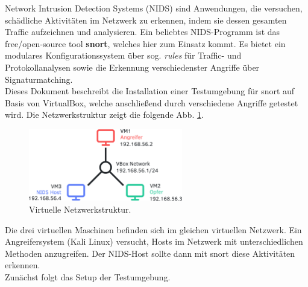 Network Intrusion Detection Systems (NIDS) sind Anwendungen, die versuchen, schädliche Aktivitäten im Netzwerk zu erkennen, indem sie dessen gesamten Traffic aufzeichnen und analysieren. Ein beliebtes NIDS-Programm ist das free/open-source tool \textbf{snort}, welches hier zum Einsatz kommt. Es bietet ein modulares Konfigurationssystem über sog. \textit{rules} für Traffic- und Protokollanalysen sowie die Erkennung verschiedenster Angriffe über Signaturmatching.\\

Dieses Dokument beschreibt die Installation einer Testumgebung für snort auf Basis von VirtualBox, welche anschließend durch verschiedene Angriffe getestet wird. Die Netzwerkstruktur zeigt die folgende Abb. \ref{fig:network-structure}.

\begin{figure}[H]
  \centering
  \includegraphics[width=0.6\textwidth]{graphics/intro/network.pdf}
  \caption{Virtuelle Netzwerkstruktur.}\label{fig:network-structure}
\end{figure}

Die drei virtuellen Maschinen befinden sich im gleichen virtuellen Netzwerk. Ein Angreifersystem (Kali Linux) versucht, Hosts im Netzwerk mit unterschiedlichen Methoden anzugreifen. Der NIDS-Host sollte dann mit snort diese Aktivitäten erkennen.\\

Zunächst folgt das Setup der Testumgebung.
